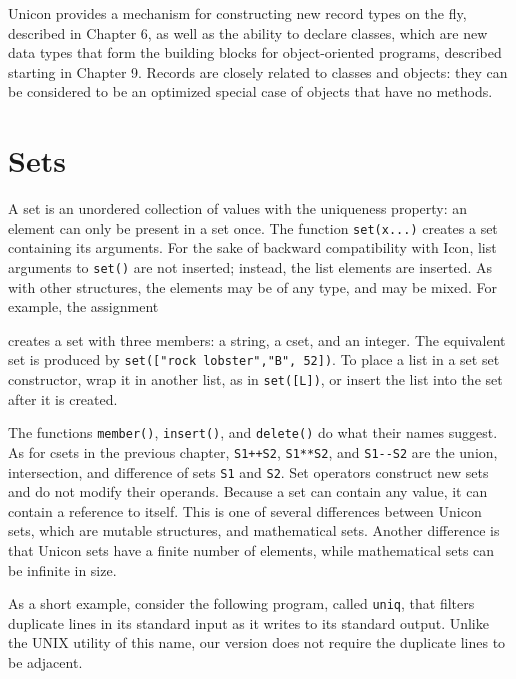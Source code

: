 Unicon provides a mechanism for constructing new record types on the
fly, described in Chapter 6, as well as the ability to declare classes,
which are new data types that form the building blocks for
object-oriented programs, described starting in Chapter 9. Records are
closely related to classes and objects: they can be considered to be an
optimized special case of objects that have no methods. \ 

\section{Sets}

A set is an unordered collection of values with the
uniqueness property: an element can only be present in a set once. The
function \texttt{set(x...)} creates a set containing its arguments. For
the sake of backward compatibility with Icon, list arguments to
\texttt{set()} are not inserted; instead, the list elements are
inserted. As with other structures, the elements may be of any type,
and may be mixed. For example, the assignment


\noindent
creates a set with three members: a string, a cset, and an integer. The
equivalent set is produced by
\texttt{set(["rock lobster","B", 52])}. To place a list in a set
set constructor, wrap it in another list, as in \texttt{set([L])},
or insert the list into the set after it is created.

The functions \texttt{member()},
\texttt{insert()}, and
\texttt{delete()} do what their names suggest. As
for csets in the previous chapter, \texttt{S1++S2}, \texttt{S1**S2},
and \texttt{S1-{}-S2} are the union,
intersection, and difference of sets \texttt{S1} and \texttt{S2}. Set
operators construct new sets and do not modify their operands. Because
a set can contain any value, it can contain a
reference to itself. This is one of several
differences between Unicon sets, which are mutable structures, and
mathematical sets. Another difference is that Unicon sets have a finite
number of elements, while mathematical sets can be infinite in size.

As a short example, consider the following program, called
\texttt{uniq}, that filters duplicate lines in its standard input as it
writes to its standard output. Unlike the UNIX utility of this name,
our version does not require the duplicate lines to be adjacent.


